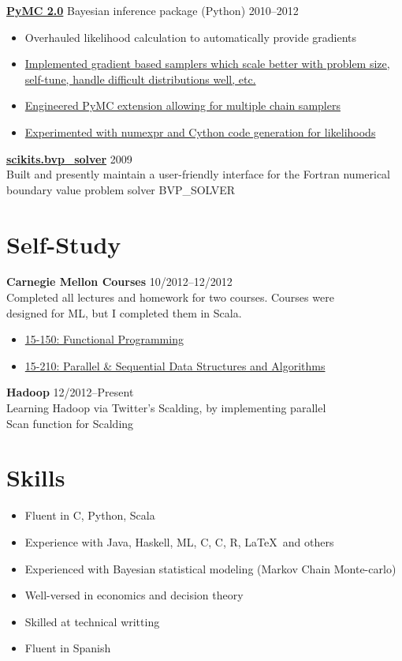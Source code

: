 \documentclass[margin]{res}
\newcommand{\bitem}{\begin{samepage}\begin{itemize} \itemsep -2pt}
\newcommand{\eitem}{\end{itemize}\end{samepage} }
\newcommand{\hrowbase}[3]{
  {\bf #1} #2 \hfill #3
}
\newcommand{\headrow}[3]{
  \hrowbase{#1}{#2}{#3}
    \vspace{6pt}
    \bitem
      }
\newcommand{\eheadrow}[0]{\eitem}
\newcommand{\headrowdesc}[3]{
  \hrowbase{#1}{}{#2} \ \\
    #3
    \vspace{6pt}
      }
\newcommand{\CPP}
{C\nolinebreak[4]\hspace{-.05em}\raisebox{.22ex}{\footnotesize\bf ++}}
\newcommand{\CS}
{C\nolinebreak[4]\hspace{-.05em}\raisebox{.22ex}{\footnotesize\#}}
\begin{document}
\begin{resume}
    \headrow{\href{https://github.com/pymc-devs/pymc\#readme}{PyMC 2.0}}{Bayesian inference package (Python)}{2010--2012}
      \item Overhauled likelihood calculation to automatically provide gradients 
      \item \href{https://github.com/jsalvatier/gradient\_samplers/blob/master/gradient\_samplers}{Implemented gradient based samplers which scale better with problem size, self-tune, handle difficult distributions well, etc.}
      \item \href{http://pypi.python.org/pypi/multichain\_mcmc}{Engineered PyMC extension allowing for multiple chain samplers}
      \item \href{https://github.com/pymc-devs/pymc/commits/numexpr\_dist}{Experimented with numexpr and Cython code generation for likelihoods}
    \eheadrow

    \headrowdesc{\href{packages.python.org/scikits.bvp\_solver}{scikits.bvp\_solver}}{2009}{
      Built and presently maintain a user-friendly interface for the Fortran numerical \\
    boundary value problem solver BVP\_SOLVER}

\section{Self-Study}
    \headrowdesc{Carnegie Mellon Courses}{10/2012--12/2012}{Completed all lectures and homework for two courses. Courses were \\
    designed for ML, but I completed them in Scala.} 
    \bitem
      \item \href{http://www.cs.cmu.edu/~15150/previous-semesters/2012-spring/}{15-150: Functional Programming}
      \item \href{http://www.cs.cmu.edu/~15210/index.html}{15-210: Parallel \& Sequential Data Structures and Algorithms}
    \eitem
    \headrowdesc{Hadoop}{12/2012--Present}{Learning Hadoop via Twitter's Scalding, by implementing parallel \\
      Scan function for Scalding}

\section{Skills}
    \bitem
      \item Fluent in \CS, Python, Scala
      \item Experience with Java, Haskell, ML, C, \CPP, R, \LaTeX\ and others
      \item Experienced with Bayesian statistical modeling (Markov Chain Monte-carlo)
      \item Well-versed in economics and decision theory
      \item Skilled at technical writting
      \item Fluent in Spanish 
    \eitem


\end{resume}
\end{document}
